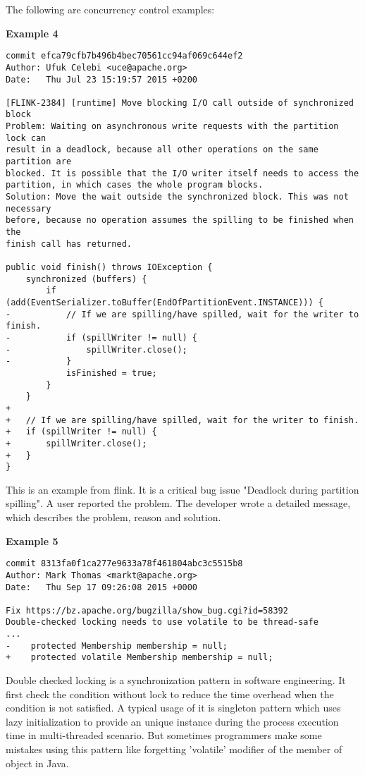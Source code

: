 \documentclass[conference]{IEEEtran}
\begin{document}
The following are concurrency control examples:

\textbf{Example 4}
\begin{lstlisting}
commit efca79cfb7b496b4bec70561cc94af069c644ef2
Author: Ufuk Celebi <uce@apache.org>
Date:   Thu Jul 23 15:19:57 2015 +0200

[FLINK-2384] [runtime] Move blocking I/O call outside of synchronized block
Problem: Waiting on asynchronous write requests with the partition lock can
result in a deadlock, because all other operations on the same partition are
blocked. It is possible that the I/O writer itself needs to access the
partition, in which cases the whole program blocks.
Solution: Move the wait outside the synchronized block. This was not necessary
before, because no operation assumes the spilling to be finished when the
finish call has returned.

public void finish() throws IOException {
	synchronized (buffers) {
		if (add(EventSerializer.toBuffer(EndOfPartitionEvent.INSTANCE))) {
-			// If we are spilling/have spilled, wait for the writer to finish.
-			if (spillWriter != null) {
-				spillWriter.close();
-			}
			isFinished = true;
		}
	}
+
+	// If we are spilling/have spilled, wait for the writer to finish.
+	if (spillWriter != null) {
+		spillWriter.close();
+	}
}
\end{lstlisting}

This is an example from flink. It is a critical bug issue "Deadlock during partition spilling". A user reported the problem. The developer wrote a detailed message, which describes the problem, reason and solution.

\textbf{Example 5}
\begin{lstlisting}
commit 8313fa0f1ca277e9633a78f461804abc3c5515b8
Author: Mark Thomas <markt@apache.org>
Date:   Thu Sep 17 09:26:08 2015 +0000

Fix https://bz.apache.org/bugzilla/show_bug.cgi?id=58392
Double-checked locking needs to use volatile to be thread-safe
...
-    protected Membership membership = null;
+    protected volatile Membership membership = null;
\end{lstlisting}
Double checked locking is a synchronization pattern in software engineering. It first check the condition without lock to reduce the time overhead when the condition is not satisfied. A typical usage of it is singleton pattern which uses lazy initialization to provide an unique instance during the process execution time in multi-threaded scenario. But sometimes programmers make some mistakes using this pattern like forgetting 'volatile' modifier of the member of object in Java.
\end{document}
